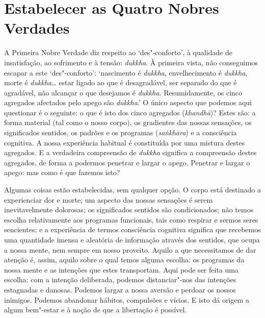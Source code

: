 \section{Estabelecer as Quatro Nobres Verdades}

A Primeira Nobre Verdade diz respeito ao `des"-conforto', à qualidade de
insatisfação, ao sofrimento e à tensão: \emph{dukkha}. À primeira vista, não
conseguimos escapar a este `des"-conforto': `nascimento é \emph{dukkha},
envelhecimento é \emph{dukkha}, morte é \emph{dukkha}\ldots{} estar ligado ao
que é desagradável, ser separado do que é agradável, não alcançar o que
desejamos é \emph{dukkha}. Resumidamente, os cinco agregados afectados pelo
apego são \emph{dukkha}.'
O único aspecto que podemos aqui questionar é o seguinte: o que é isto dos cinco
agregados (\emph{khandhā})? Estes são: a forma material (tal como o nosso
corpo), os gradientes das nossas sensações, os significados sentidos, os padrões
e os programas (\emph{saṅkhāra}) e a consciência cognitiva. A nossa experiência
habitual é constituída por uma mistura destes agregados. E a verdadeira
compreensão de \emph{dukkha} significa a compreensão destes agregados, de forma
a podermos penetrar e largar o apego. Penetrar e largar o apego: mas como é que
fazemos isto?

Algumas coisas estão estabelecidas, sem qualquer opção. O corpo está destinado a
experienciar dor e morte; um aspecto das nossas sensações é serem
inevitavelmente dolorosas; os significados sentidos são condicionados; não temos
escolha relativamente aos programas funcionais, tais como respirar e sermos
seres sencientes; e a experiência de termos consciência cognitiva significa que
recebemos uma quantidade imensa e aleatória de informação através dos sentidos,
que ocupa a nossa mente, nem sempre em nosso proveito. Aquilo a que necessitamos
de dar atenção é, assim, aquilo sobre o qual temos alguma escolha: os programas
da nossa mente e as intenções que estes transportam. Aqui pode ser feita uma
escolha: com a intenção deliberada, podemos distanciar"-nos das intenções
estagnadas e danosas. Podemos largar a nossa aversão e perdoar os nossos
inimigos. Podemos abandonar hábitos, compulsões e vícios. E isto dá origem a
algum bem"-estar e à noção de que a libertação é possível.

